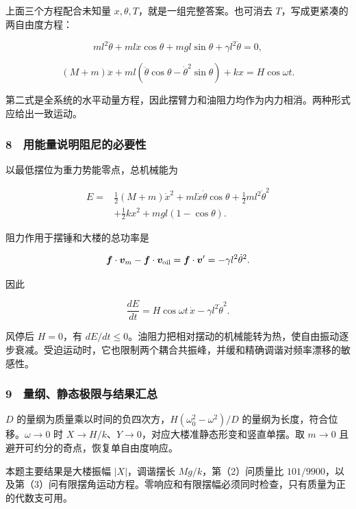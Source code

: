 \documentclass[12pt,a4paper,fontset=fandol]{ctexart}
\begin{document}
上面三个方程配合未知量 \(x,\theta,T\)，就是一组完整答案。也可消去
\(T\)，写成更紧凑的两自由度方程：

\[\boxed{ml^2\ddot\theta+ml\ddot x\cos\theta
+mgl\sin\theta+\gamma l^2\dot\theta=0,}\]

\[\boxed{(M+m)\ddot x
+ml(\ddot\theta\cos\theta-\dot\theta^2\sin\theta)
+kx=H\cos\omega t.}\]

第二式是全系统的水平动量方程，因此摆臂力和油阻力均作为内力相消。两种形式应给出一致运动。

\subsubsection{8　用能量说明阻尼的必要性}\label{ux7528ux80fdux91cfux8bf4ux660eux963bux5c3cux7684ux5fc5ux8981ux6027}

以最低摆位为重力势能零点，总机械能为

\[\begin{aligned}
E={}&\frac12(M+m)\dot x^2
+ml\dot x\dot\theta\cos\theta
+\frac12ml^2\dot\theta^2\\
&+\frac12kx^2+mgl(1-\cos\theta).
\end{aligned}\]

阻力作用于摆锤和大楼的总功率是

\[\boldsymbol f\cdot\boldsymbol v_m
-\boldsymbol f\cdot\boldsymbol v_{\rm oil}
=\boldsymbol f\cdot\boldsymbol v'
=-\gamma l^2\dot\theta^2.\]

因此

\[\boxed{\frac{dE}{dt}
=H\cos\omega t\,\dot x-\gamma l^2\dot\theta^2.}\]

风停后 \(H=0\)，有
\(dE/dt\le0\)。油阻力把相对摆动的机械能转为热，使自由振动逐步衰减。受迫运动时，它也限制两个耦合共振峰，并缓和精确调谐对频率漂移的敏感性。

\subsubsection{9　量纲、静态极限与结果汇总}\label{ux91cfux7eb2ux9759ux6001ux6781ux9650ux4e0eux7ed3ux679cux6c47ux603b}

\(D\) 的量纲为质量乘以时间的负四次方，\(H(\omega_0^2-\omega^2)/D\)
的量纲为长度，符合位移。\(\omega\to0\) 时
\(X\to H/k\)、\(Y\to0\)，对应大楼准静态形变和竖直单摆。取 \(m\to0\)
且避开可约分的奇点，恢复单自由度响应。

本题主要结果是大楼振幅 \(|X|\)，调谐摆长 \(Mg/k\)，第（2）问质量比
\(101/9900\)，以及第（3）问有限摆角运动方程。零响应和有限摆幅必须同时检查，只有质量为正的代数支可用。
\end{document}
